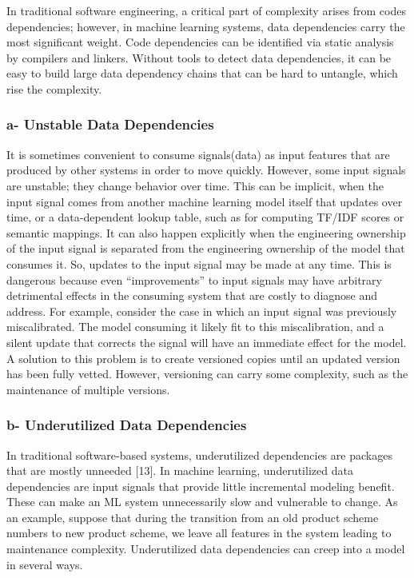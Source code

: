 \documentclass[]{article}
\begin{document}
In traditional software engineering, a critical part of complexity
arises from codes dependencies; however, in machine learning systems,
data dependencies carry the most significant weight. Code dependencies
can be identified via static analysis by compilers and linkers. Without
tools to detect data dependencies, it can be easy to build large data
dependency chains that can be hard to untangle, which rise the
complexity.

\subsubsection{a- Unstable Data
Dependencies}\label{a--unstable-data-dependencies}

It is sometimes convenient to consume signals(data) as input features
that are produced by other systems in order to move quickly. However,
some input signals are unstable; they change behavior over time. This
can be implicit, when the input signal comes from another machine
learning model itself that updates over time, or a data-dependent lookup
table, such as for computing TF/IDF scores or semantic mappings. It can
also happen explicitly when the engineering ownership of the input
signal is separated from the engineering ownership of the model that
consumes it. So, updates to the input signal may be made at any time.
This is dangerous because even ``improvements'' to input signals may
have arbitrary detrimental effects in the consuming system that are
costly to diagnose and address. For example, consider the case in which
an input signal was previously miscalibrated. The model consuming it
likely fit to this miscalibration, and a silent update that corrects the
signal will have an immediate effect for the model. A solution to this
problem is to create versioned copies until an updated version has been
fully vetted. However, versioning can carry some complexity, such as the
maintenance of multiple versions.

\subsubsection{b- Underutilized Data
Dependencies}\label{b--underutilized-data-dependencies}

In traditional software-based systems, underutilized dependencies are
packages that are mostly unneeded {[}13{]}. In machine learning,
underutilized data dependencies are input signals that provide little
incremental modeling benefit. These can make an ML system unnecessarily
slow and vulnerable to change. As an example, suppose that during the
transition from an old product scheme numbers to new product scheme, we
leave all features in the system leading to maintenance complexity.
Underutilized data dependencies can creep into a model in several ways.
\end{document}
